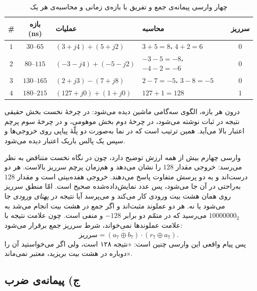 \documentclass[12pt,a4paper]{article}
\begin{document}
	\begin{table}[H]
		\centering
		\footnotesize
		\begin{tabular}{|c|c|l|l|c|}
			\hline
			\textbf{\#} & \textbf{بازه (ns)} & \textbf{عملیات} & \textbf{محاسبه} & \textbf{سرریز} \\ \hline
			\(1\) & \(30\)--\(65\)   & \((3+j4)+(5+j2)\)     & \(3+5=8\)، \(4+2=6\)      & \(0\) \\ \hline
			\(2\) & \(80\)--\(115\)  & \((-3-j4)+(-5-j2)\)   & \(-3-5=-8\)، \(-4-2=-6\)  & \(0\) \\ \hline
			\(3\) & \(130\)--\(165\) & \((2+j3)-(7+j8)\)     & \(2-7=-5\)، \(3-8=-5\)    & \(0\) \\ \hline
			\(4\) & \(180\)--\(215\) & \((127+j0)+(1+j0)\)   & \(127+1=128\)             & \(1\) \\ \hline
		\end{tabular}
		\caption{چهار وارسی پیمانه‌ی جمع و تفریق با بازه‌ی زمانی و محاسبه‌ی هر یک}
	\end{table}

	درون هر بازه، الگوی سه‌گامی ماشین دیده می‌شود: در چرخهٔ نخست بخش حقیقی نتیجه در ثبات نوشته می‌شود، در چرخهٔ دوم بخش موهومی، و در چرخهٔ سوم پرچم اعتبار بالا می‌آید. همین ترتیب است که در نما به‌صورت دو پلّهٔ پیاپی روی خروجی‌ها و سپس یک پالس باریک اعتبار دیده می‌شود.

	وارسی چهارم بیش از همه ارزش توضیح دارد، چون در نگاه نخست متناقض به نظر می‌رسد: خروجی مقدار \(128\) را نشان می‌دهد و هم‌زمان پرچم سرریز بالاست. هر دو درست‌اند و به دو پرسش متفاوت پاسخ می‌دهند. خروجی هفده‌بیتی است و مقدار \(128\) به‌راحتی در آن جا می‌شود، پس عدد نمایش‌داده‌شده صحیح است. امّا منطق سرریز روی همان هشت بیت ورودی کار می‌کند و می‌پرسد آیا نتیجه در \emph{پهنای ورودی} جا می‌شود یا نه. هر دو عملوند مثبت‌اند و اگر جمع در هشت بیت انجام می‌شد به \(10000000_2\) می‌رسید که در متمّم دو برابر \(-128\) و منفی است. چون علامت نتیجه با علامت عملوندها نمی‌خواند، شرط سرریز جمع برقرار می‌شود:
	\[
	\text{سرریز} = \overline{(a_7 \oplus b_7)} \cdot (r_7 \oplus a_7).
	\]
	پس پیام واقعی این وارسی چنین است: «نتیجه ۱۲۸ است، ولی اگر می‌خواستید آن را دوباره در هشت بیت بریزید، معتبر نمی‌ماند».

	\subsection*{ج) پیمانه‌ی ضرب}
\end{document}
